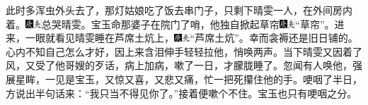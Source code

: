 此时多浑虫外头去了，那灯姑娘吃了饭去串门子，只剩下晴雯一人，在外间房内着。{\includegraphics[width=3mm]{../Images/00004}\includegraphics[width=3mm]{../Images/00012}\footnotesize \kaishu 总哭晴雯。}宝玉命那婆子在院门了哨，他独自掀起草帘{\includegraphics[width=3mm]{../Images/00004}\includegraphics[width=3mm]{../Images/00012}\footnotesize \kaishu ``草帘''。}进来，一眼就看见晴雯睡在芦席土炕上，{\includegraphics[width=3mm]{../Images/00004}\includegraphics[width=3mm]{../Images/00012}\footnotesize \kaishu ``芦席土炕''。}幸而衾褥还是旧日铺的。心内不知自己怎么才好，因上来含泪伸手轻轻拉他，悄唤两声。当下晴雯又因着了风，又受了他哥嫂的歹话，病上加病，嗽了一日，才朦胧睡了。忽闻有人唤他，强展星眸，一见是宝玉，又惊又喜，又悲又痛，忙一把死攥住他的手。哽咽了半日，方说出半句话来：``我只当不得见你了。''接着便嗽个不住。宝玉也只有哽咽之分。


